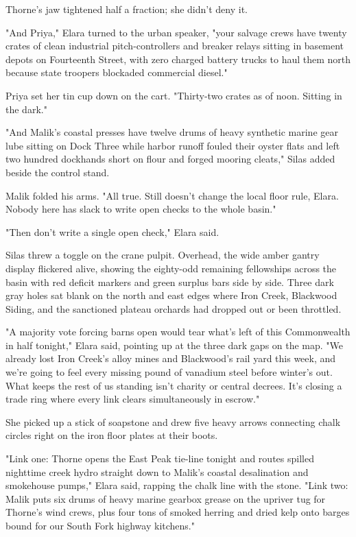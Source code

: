 Thorne's jaw tightened half a fraction; she didn't deny it.

"And Priya," Elara turned to the urban speaker, "your salvage crews have twenty crates of clean industrial pitch-controllers and breaker relays sitting in basement depots on Fourteenth Street, with zero charged battery trucks to haul them north because state troopers blockaded commercial diesel."

Priya set her tin cup down on the cart. "Thirty-two crates as of noon. Sitting in the dark."

"And Malik's coastal presses have twelve drums of heavy synthetic marine gear lube sitting on Dock Three while harbor runoff fouled their oyster flats and left two hundred dockhands short on flour and forged mooring cleats," Silas added beside the control stand.

Malik folded his arms. "All true. Still doesn't change the local floor rule, Elara. Nobody here has slack to write open checks to the whole basin."

"Then don't write a single open check," Elara said.

Silas threw a toggle on the crane pulpit. Overhead, the wide amber gantry display flickered alive, showing the eighty-odd remaining fellowships across the basin with red deficit markers and green surplus bars side by side. Three dark gray holes sat blank on the north and east edges where Iron Creek, Blackwood Siding, and the sanctioned plateau orchards had dropped out or been throttled.

"A majority vote forcing barns open would tear what's left of this Commonwealth in half tonight," Elara said, pointing up at the three dark gaps on the map. "We already lost Iron Creek's alloy mines and Blackwood's rail yard this week, and we're going to feel every missing pound of vanadium steel before winter's out. What keeps the rest of us standing isn't charity or central decrees. It's closing a trade ring where every link clears simultaneously in escrow."

She picked up a stick of soapstone and drew five heavy arrows connecting chalk circles right on the iron floor plates at their boots.

"Link one: Thorne opens the East Peak tie-line tonight and routes spilled nighttime creek hydro straight down to Malik's coastal desalination and smokehouse pumps," Elara said, rapping the chalk line with the stone. "Link two: Malik puts six drums of heavy marine gearbox grease on the upriver tug for Thorne's wind crews, plus four tons of smoked herring and dried kelp onto barges bound for our South Fork highway kitchens."

